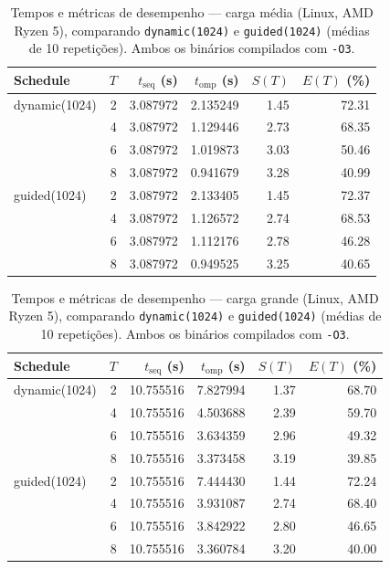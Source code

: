 \documentclass[12pt,a4paper]{article}
\begin{document}
\begin{table}[H]
\centering\small
\caption{Tempos e métricas de desempenho --- carga média (Linux, AMD Ryzen 5), comparando \texttt{dynamic(1024)} e \texttt{guided(1024)} (médias de 10 repetições). Ambos os binários compilados com \texttt{-O3}.}
\begin{tabular}{lrrrrr}
\toprule
\textbf{Schedule} & $T$ & $t_{\mathrm{seq}}$ (s) & $t_{\mathrm{omp}}$ (s) & $S(T)$ & $E(T)$ (\%) \\
\midrule
dynamic(1024) & 2 & 3.087972 & 2.135249 & 1.45 & 72.31 \\
              & 4 & 3.087972 & 1.129446 & 2.73 & 68.35 \\
              & 6 & 3.087972 & 1.019873 & 3.03 & 50.46 \\
              & 8 & 3.087972 & 0.941679 & 3.28 & 40.99 \\
\midrule
guided(1024)  & 2 & 3.087972 & 2.133405 & 1.45 & 72.37 \\
              & 4 & 3.087972 & 1.126572 & 2.74 & 68.53 \\
              & 6 & 3.087972 & 1.112176 & 2.78 & 46.28 \\
              & 8 & 3.087972 & 0.949525 & 3.25 & 40.65 \\
\bottomrule
\end{tabular}
\end{table}

\begin{table}[H]
\centering\small
\caption{Tempos e métricas de desempenho --- carga grande (Linux, AMD Ryzen 5), comparando \texttt{dynamic(1024)} e \texttt{guided(1024)} (médias de 10 repetições). Ambos os binários compilados com \texttt{-O3}.}
\begin{tabular}{lrrrrr}
\toprule
\textbf{Schedule} & $T$ & $t_{\mathrm{seq}}$ (s) & $t_{\mathrm{omp}}$ (s) & $S(T)$ & $E(T)$ (\%) \\
\midrule
dynamic(1024) & 2 & 10.755516 & 7.827994 & 1.37 & 68.70 \\
              & 4 & 10.755516 & 4.503688 & 2.39 & 59.70 \\
              & 6 & 10.755516 & 3.634359 & 2.96 & 49.32 \\
              & 8 & 10.755516 & 3.373458 & 3.19 & 39.85 \\
\midrule
guided(1024)  & 2 & 10.755516 & 7.444430 & 1.44 & 72.24 \\
              & 4 & 10.755516 & 3.931087 & 2.74 & 68.40 \\
              & 6 & 10.755516 & 3.842922 & 2.80 & 46.65 \\
              & 8 & 10.755516 & 3.360784 & 3.20 & 40.00 \\
\bottomrule
\end{tabular}
\end{table}
\end{document}
